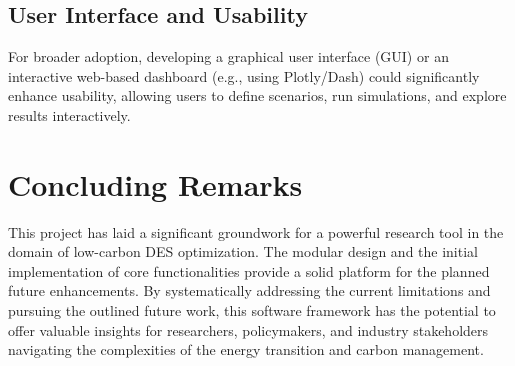 \subsection{User Interface and Usability}
For broader adoption, developing a graphical user interface (GUI) or an interactive web-based dashboard (e.g., using Plotly/Dash) could significantly enhance usability, allowing users to define scenarios, run simulations, and explore results interactively.

\section{Concluding Remarks}
This project has laid a significant groundwork for a powerful research tool in the domain of low-carbon DES optimization. The modular design and the initial implementation of core functionalities provide a solid platform for the planned future enhancements. By systematically addressing the current limitations and pursuing the outlined future work, this software framework has the potential to offer valuable insights for researchers, policymakers, and industry stakeholders navigating the complexities of the energy transition and carbon management.
